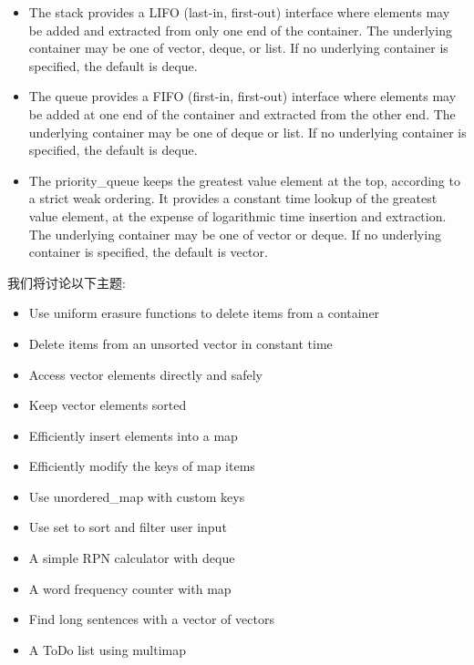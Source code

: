 \begin{itemize}
\item 
The stack provides a LIFO (last-in, first-out) interface where elements may be added and extracted from only one end of the container. The underlying container may be one of vector, deque, or list. If no underlying container is specified, the default is deque.

\item 
The queue provides a FIFO (first-in, first-out) interface where elements may be added at one end of the container and extracted from the other end. The underlying container may be one of deque or list. If no underlying container is specified, the default is deque.

\item 
The priority\_queue keeps the greatest value element at the top, according to a strict weak ordering. It provides a constant time lookup of the greatest value element, at the expense of logarithmic time insertion and extraction. The underlying container may be one of vector or deque. If no underlying container is specified, the default is vector.
\end{itemize}

我们将讨论以下主题:

\begin{itemize}
\item 
Use uniform erasure functions to delete items from a container

\item 
Delete items from an unsorted vector in constant time

\item 
Access vector elements directly and safely

\item 
Keep vector elements sorted

\item 
Efficiently insert elements into a map

\item 
Efficiently modify the keys of map items

\item 
Use unordered\_map with custom keys

\item 
Use set to sort and filter user input

\item 
A simple RPN calculator with deque

\item 
A word frequency counter with map

\item 
Find long sentences with a vector of vectors

\item 
A ToDo list using multimap
\end{itemize}












